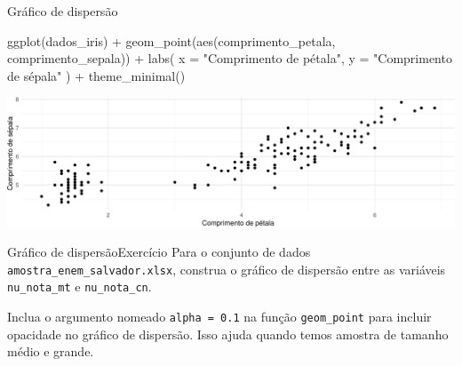 \documentclass[
  10pt,
  ignorenonframetext,
]{beamer}
\newenvironment{Shaded}{}{}
\newcommand{\DataTypeTok}[1]{#1}
\newcommand{\KeywordTok}[1]{\textcolor[rgb]{0.00,0.00,1.00}{#1}}
\newcommand{\NormalTok}[1]{#1}
\newcommand{\OperatorTok}[1]{#1}
\newcommand{\StringTok}[1]{\textcolor[rgb]{0.00,0.50,0.50}{#1}}
\begin{document}
\begin{frame}[fragile]{Gráfico de dispersão}
\protect\hypertarget{gruxe1fico-de-dispersuxe3o}{}
\small

\begin{Shaded}
\begin{Highlighting}[]
\KeywordTok{ggplot}\NormalTok{(dados\_iris) }\OperatorTok{+}
\StringTok{  }\KeywordTok{geom\_point}\NormalTok{(}\KeywordTok{aes}\NormalTok{(comprimento\_petala, comprimento\_sepala)) }\OperatorTok{+}
\StringTok{  }\KeywordTok{labs}\NormalTok{(}
    \DataTypeTok{x =} \StringTok{"Comprimento de pétala"}\NormalTok{,}
    \DataTypeTok{y =} \StringTok{"Comprimento de sépala"}
\NormalTok{  ) }\OperatorTok{+}
\StringTok{  }\KeywordTok{theme\_minimal}\NormalTok{()}
\end{Highlighting}
\end{Shaded}

\begin{center}\includegraphics[width=0.75\linewidth]{aulas_files/figure-beamer/unnamed-chunk-73-1} \end{center}

\normalsize
\end{frame}

\begin{frame}[fragile]{Gráfico de dispersão\newline Exercício}
\protect\hypertarget{gruxe1fico-de-dispersuxe3oexercuxedcio}{}
Para o conjunto de dados \texttt{amostra\_enem\_salvador.xlsx}, construa
o gráfico de dispersão entre as variáveis \texttt{nu\_nota\_mt} e
\texttt{nu\_nota\_cn}.

Inclua o argumento nomeado \texttt{alpha\ =\ 0.1} na função
\texttt{geom\_point} para incluir opacidade no gráfico de dispersão.
Isso ajuda quando temos amostra de tamanho médio e grande.
\end{frame}
\end{document}
